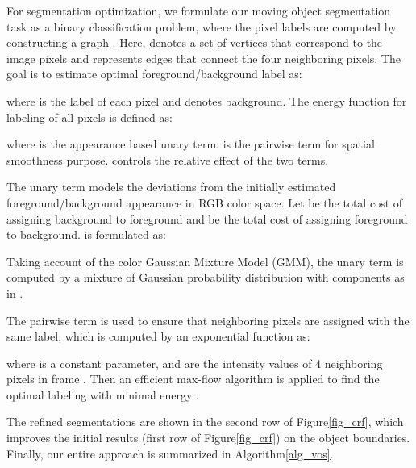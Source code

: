 \documentclass[journal]{IEEEtran}
\makeatletter
\newcommand{\fig}{{Figure}\@\xspace}
\newcommand{\alg}{{Algorithm}\@\xspace}
\makeatother
\begin{document}
For segmentation optimization, we formulate our moving object segmentation task as a binary classification problem,
where the pixel labels are computed by constructing a graph \mbox{{\small }}.
Here, {\small } denotes a set of vertices that correspond to the image pixels and {\small } represents edges that connect the four neighboring pixels.
The goal is to estimate optimal foreground/background label {\small } as:

where {\small } is the label of each pixel and  denotes background. 
The energy function for labeling {\small } of all pixels is defined as:

where {\small } is the appearance based unary term.
{\small } is the pairwise term for spatial smoothness purpose.
 controls the relative effect of the two terms.

The unary term {\small } models the deviations from the initially estimated foreground/background appearance in RGB color space.
Let {\small } be the total cost of assigning background to foreground and {\small } be the total cost of assigning foreground to background.
{\small } is formulated as:


\noindent
Taking account of the color Gaussian Mixture Model (GMM), the unary term is computed by a mixture of Gaussian probability distribution with  components as in \cite{TOG2004_Rother}.

The pairwise term {\small } is used to ensure that neighboring pixels are assigned with the same label, 
which is computed by an exponential function as:


\noindent
where {\small } is a constant parameter, {\small } and {\small } are the intensity values of 4 neighboring pixels in frame {\small }.
Then an efficient max-flow algorithm is applied to find the optimal labeling with minimal energy \cite{TOG2004_Rother}.

The refined segmentations are shown in the second row of \fig \ref{fig_crf}, 
which improves the initial results (first row of \fig \ref{fig_crf}) on the object boundaries.
Finally, our entire approach is summarized in \alg \ref{alg_vos}. 
\end{document}
